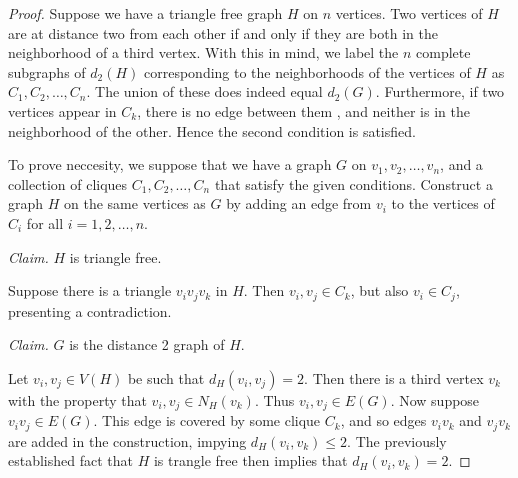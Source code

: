 


\begin{proof}
Suppose we have a triangle free graph $H$ on $n$ vertices.  Two vertices of $H$ are at distance two from each other if and only if they are both in the neighborhood of a third vertex.  With this in mind, we label the $n$ complete subgraphs of $d_2(H)$ corresponding to the neighborhoods of the vertices of $H$ as $C_1, C_2, \ldots, C_n$.  The union of these does indeed equal $d_2(G)$.  Furthermore, if two vertices appear in $C_k$, there is no edge between them , and neither is in the neighborhood of the other.  Hence the second condition is satisfied.

To prove neccesity, we suppose that we have a graph $G$ on $v_1, v_2, \ldots, v_n$, and a collection of cliques $C_1, C_2, \ldots, C_n$ that satisfy the given conditions.  Construct a graph $H$ on the same vertices as $G$ by adding an edge from $v_i$ to the vertices of $C_i$ for all $i = 1, 2, \ldots, n$.  

\noindent\textit{Claim.} $H$ is triangle free.

Suppose there is a triangle $v_iv_jv_k$ in $H$.  Then $v_i, v_j \in C_k$, but also $v_i \in C_j$, presenting a contradiction.

\noindent\textit{Claim.}  $G$ is the distance 2 graph of $H$.

Let $v_i, v_j \in V(H)$ be such that $d_H(v_i,v_j) = 2$.  Then there is a third vertex $v_k$ with the property that $v_i, v_j \in N_H(v_k)$.  Thus $v_i, v_j \in E(G)$.  Now suppose $v_iv_j \in E(G)$.  This edge is covered by some clique $C_k$, and so edges $v_iv_k$ and $v_jv_k$ are added in the construction, impying $d_H(v_i, v_k) \leq 2$.  The previously established fact that $H$ is trangle free then implies that $d_H(v_i, v_k) =2$.
\end{proof}



